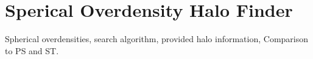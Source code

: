\section{Sperical Overdensity Halo Finder}

Spherical overdensities, search algorithm, 
provided halo information, Comparison to PS and ST.
